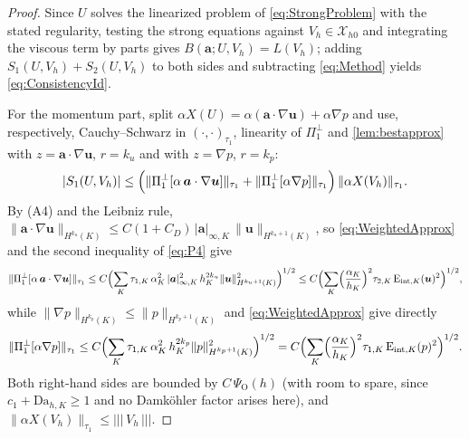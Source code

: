 \documentclass[11pt]{article}
\theoremstyle{remark}
\newcommand{\bu}{\boldsymbol{u}}
\newcommand{\ba}{\boldsymbol{a}}
\newcommand{\norm}[1]{\lVert #1 \rVert}
\newcommand{\tnorm}[1]{\lvert\!\lvert\!\lvert\, #1 \,\rvert\!\rvert\!\rvert}
\newcommand{\Eint}[2]{\mathrm{E}_{\mathrm{int},#1}(#2)}
\newcommand{\Dah}{\mathrm{Da}_{h,K}}
\newcommand{\Poneo}{\Pi_{1}^{\perp}}
\newcommand{\Xhz}{\mathcal{X}_{h0}}
\begin{document}
\begin{proof}
Since $U$ solves the linearized problem of \cref{eq:StrongProblem} with the stated regularity, testing the
strong equations against $V_h \in \Xhz$ and integrating the viscous term by parts
gives $B(\ba; U, V_h) = L(V_h)$; adding $S_1(U,V_h) + S_2(U,V_h)$ to both sides and
subtracting \cref{eq:Method} yields \cref{eq:ConsistencyId}.

For the momentum part, split $\alpha X(U) = \alpha(\ba\cdot\nabla\bu) + \alpha\nabla p$
and use, respectively, Cauchy--Schwarz in $(\cdot,\cdot)_{\tau_1}$, linearity of
$\Poneo$ and \cref{lem:bestapprox} with $z = \ba\cdot\nabla\bu$, $r = k_u$ and with
$z = \nabla p$, $r = k_p$:
\[
  |S_1(U, V_h)|
  \le \Bigl( \norm{\Poneo[\alpha\,\ba\cdot\nabla\bu]}_{\tau_1}
  + \norm{\Poneo[\alpha\nabla p]}_{\tau_1} \Bigr)\,\norm{\alpha X(V_h)}_{\tau_1}.
\]
By (A4) and the Leibniz rule,
$\norm{\ba\cdot\nabla\bu}_{H^{k_u}(K)} \le C(1+C_D)\,|\ba|_{\infty,K}\,
\norm{\bu}_{H^{k_u+1}(K)}$, so \cref{eq:WeightedApprox} and the second inequality of
\cref{eq:P4} give
\[
  \norm{\Poneo[\alpha\,\ba\cdot\nabla\bu]}_{\tau_1}
  \le C \Bigl( \sum_K \tau_{1,K}\,\alpha_K^2\,|\ba|_{\infty,K}^2\, h_K^{2k_u}
  \norm{\bu}_{H^{k_u+1}(K)}^2 \Bigr)^{1/2}
  \le C \Bigl( \sum_K \Bigl(\frac{\alpha_K}{h_K}\Bigr)^{2} \tau_{2,K}\,
  \Eint{K}{\bu}^2 \Bigr)^{1/2},
\]
while $\norm{\nabla p}_{H^{k_p}(K)} \le \norm{p}_{H^{k_p+1}(K)}$ and
\cref{eq:WeightedApprox} give directly
\[
  \norm{\Poneo[\alpha\nabla p]}_{\tau_1}
  \le C \Bigl( \sum_K \tau_{1,K}\,\alpha_K^2\, h_K^{2k_p}
  \norm{p}_{H^{k_p+1}(K)}^2 \Bigr)^{1/2}
  = C \Bigl( \sum_K \Bigl(\frac{\alpha_K}{h_K}\Bigr)^{2} \tau_{1,K}\,
  \Eint{K}{p}^2 \Bigr)^{1/2}.
\]
Both right-hand sides are bounded by $C\,\Psi_{\mathrm O}(h)$ (with room to spare, since
$c_1+\Dah \ge 1$ and no Damk\"ohler factor arises here), and
$\norm{\alpha X(V_h)}_{\tau_1} \le \tnorm{V_h}$.


\end{proof}
\end{document}
